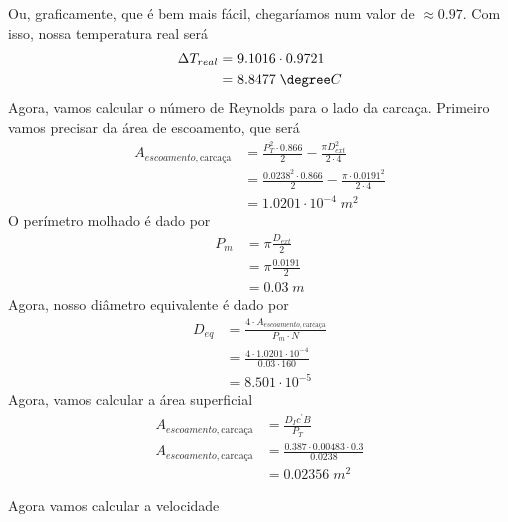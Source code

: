Ou, graficamente, que é bem mais fácil, chegaríamos num valor de \( \approx 0.97\). Com isso, nossa
temperatura real será
\begin{align}
    \Delta T_{real} &= 9.1016 \cdot 0.9721\\
    &= 8.8477 \; \degree C
\end{align}
Agora, vamos calcular o número de Reynolds para o lado da carcaça. Primeiro vamos precisar da área
de escoamento, que será
\begin{align}
    A_{escoamento, \text{carcaça}} &= \frac{P_{T} ^{2} \cdot 0.866}{2} - \frac{\pi D_{ext} ^{2} }{2 \cdot 4}\\
    &= \frac{0.0238^{2} \cdot 0.866}{2} - \frac{\pi \cdot 0.0191^{2} }{2 \cdot 4}\\
    &= 1.0201 \cdot 10^{-4} \; m^{2}
\end{align}
O perímetro molhado é dado por
\begin{align}
    P_{m} &= \pi \frac{D_{ext}}{2}\\
    &= \pi \frac{0.0191}{2}\\
    &= 0.03 \; m
\end{align}
Agora, nosso diâmetro equivalente é dado por
\begin{align}
    D_{eq} &= \frac{4 \cdot A_{escoamento, \text{carcaça}}}{P_{m} \cdot N}\\
    &= \frac{4 \cdot 1.0201 \cdot 10^{-4}}{0.03 \cdot 160}\\
    &= 8.501 \cdot 10^{-5}
\end{align}
Agora, vamos calcular a área superficial
\begin{align}
    A_{escoamento, \text{carcaça}} &= \frac{D_{I} c^{\prime} B}{P_{T} } \\
    A_{escoamento, \text{carcaça}} &= \frac{0.387 \cdot 0.00483 \cdot 0.3}{0.0238}\\
    &= 0.02356 \; m^{2} 
\end{align}

Agora vamos calcular a velocidade


